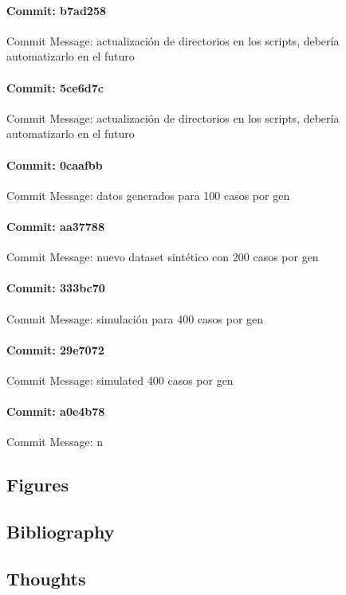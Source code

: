 \documentclass{article}
\begin{document}
\paragraph{Commit: b7ad258}
Commit Message: actualización de directorios en los scripts, debería automatizarlo en el futuro

\paragraph{Commit: 5ce6d7c}
Commit Message: actualización de directorios en los scripts, debería automatizarlo en el futuro

\paragraph{Commit: 0caafbb}
Commit Message: datos generados para 100 casos por gen

\paragraph{Commit: aa37788}
Commit Message: nuevo dataset sintético con 200 casos por gen

\paragraph{Commit: 333bc70}
Commit Message: simulación para 400 casos por gen

\paragraph{Commit: 29e7072}
Commit Message: simulated 400 casos por gen

\paragraph{Commit: a0e4b78}
Commit Message: n

\subsection{Figures}
\subsection{Bibliography}
\subsection{Thoughts}
\end{document}
